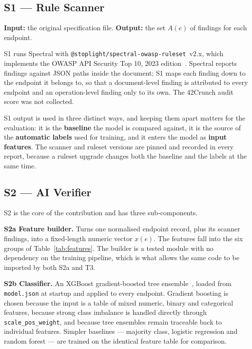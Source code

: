 \documentclass[conference]{IEEEtran}
\begin{document}
\subsection{S1 --- Rule Scanner}
\textbf{Input:} the original specification file. \textbf{Output:} the set $A(e)$ of findings
for each endpoint.

S1 runs Spectral with \texttt{@stoplight/\allowbreak spectral-\allowbreak owasp-\allowbreak ruleset}~v2.x, which implements the
OWASP API Security Top 10, 2023 edition~\cite{owasptop10,spectralowasp}. Spectral reports
findings against JSON paths inside the document; S1 maps each finding down to the endpoint it
belongs to, so that a document-level finding is attributed to every endpoint and an
operation-level finding only to its own. The 42Crunch audit score was not collected.

S1 output is used in three distinct ways, and keeping them apart matters for the evaluation:
it is the \textbf{baseline} the model is compared against, it is the source of the
\textbf{automatic labels} used for training, and it enters the model as \textbf{input
features}. The scanner and ruleset versions are pinned and recorded in every report, because
a ruleset upgrade changes both the baseline and the labels at the same time.

\subsection{S2 --- AI Verifier}
S2 is the core of the contribution and has three sub-components.

\textbf{S2a Feature builder.} Turns one normalised endpoint record, plus its scanner
findings, into a fixed-length numeric vector $x(e)$. The features fall into the six groups of
Table~\ref{tab:features}. The builder is a tested module with no dependency on the training
pipeline, which is what allows the same code to be imported by both S2a and T3.

\textbf{S2b Classifier.} An XGBoost gradient-boosted tree ensemble~\cite{xgboost}, loaded
from \texttt{model.json} at startup and applied to every endpoint. Gradient boosting is
chosen because the input is a table of mixed numeric, binary and categorical features,
because strong class imbalance is handled directly through \texttt{scale\_pos\_weight}, and
because tree ensembles remain traceable back to individual features. Simpler baselines ---
majority class, logistic regression and random forest --- are trained on the identical
feature table for comparison.
\end{document}
